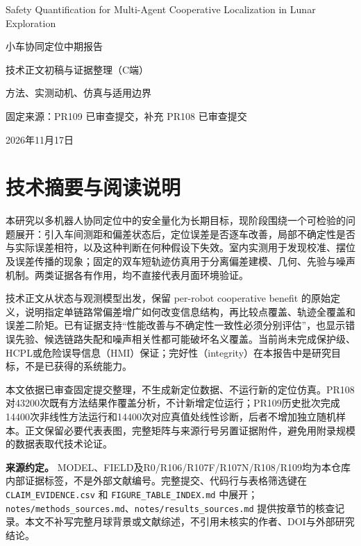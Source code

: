 \documentclass[12pt,a4paper]{article}
\begin{document}
\hypersetup{pageanchor=false}
\begin{titlepage}
\centering
\vspace*{28mm}
{\LARGE Safety Quantification for Multi-Agent Cooperative Localization in Lunar Exploration\par}
\vspace{16mm}
{\Huge 小车协同定位中期报告\par}
\vspace{10mm}
{\Large 技术正文初稿与证据整理（C端）\par}
\vspace{16mm}
{\large 方法、实测动机、仿真与适用边界\par}
\vfill
{\normalsize 固定来源：PR109 已审查提交，补充 PR108 已审查提交\par}
\vspace{5mm}
{\normalsize 2026年11月17日\par}
\end{titlepage}
\tableofcontents
\clearpage
\setcounter{page}{1}
\hypersetup{pageanchor=true}
\section{技术摘要与阅读说明}\label{ux6280ux672fux6458ux8981ux4e0eux9605ux8bfbux8bf4ux660e}

本研究以多机器人协同定位中的安全量化为长期目标，现阶段围绕一个可检验的问题展开：引入车间测距和偏差状态后，定位误差是否逐车改善，局部不确定性是否与实际误差相符，以及这种判断在何种假设下失效。室内实测用于发现校准、摆位及误差传播的现象；固定的双车短轨迹仿真用于分离偏差建模、几何、先验与噪声机制。两类证据各有作用，均不直接代表月面环境验证。

技术正文从状态与观测模型出发，保留 per-robot cooperative benefit
的原始定义，说明指定单链路常偏差增广如何改变信息结构，再比较点覆盖、轨迹全覆盖和误差二阶矩。已有证据支持``性能改善与不确定性一致性必须分别评估''，也显示错误先验、候选链路失配和噪声相关性都可能破坏名义覆盖。当前尚未完成保护级、HCPL或危险误导信息（HMI）保证；完好性（integrity）在本报告中是研究目标，不是已获得的系统能力。

本文依据已审查固定提交整理，不生成新定位数据、不运行新的定位仿真。PR108对43200次既有方法结果作覆盖分析，不计新增定位运行；PR109历史批次完成14400次非线性方法运行和14400次对应真值处线性诊断，后者不增加独立随机样本。正文保留必要代表表图，完整矩阵与来源行号另置证据附件，避免用附录规模的数据表取代技术论证。

\textbf{来源约定。}
MODEL、FIELD及R0/R106/R107F/R107N/R108/R109均为本仓库内部证据标签，不是外部文献编号。完整提交、代码行与表格筛选键在
\texttt{CLAIM\_EVIDENCE.csv} 和 \texttt{FIGURE\_TABLE\_INDEX.md}
中展开；\texttt{notes/methods\_sources.md}、\texttt{notes/results\_sources.md}
提供按章节的核查记录。本文不补写完整月球背景或文献综述，不引用未核实的作者、DOI与外部研究结论。
\end{document}

